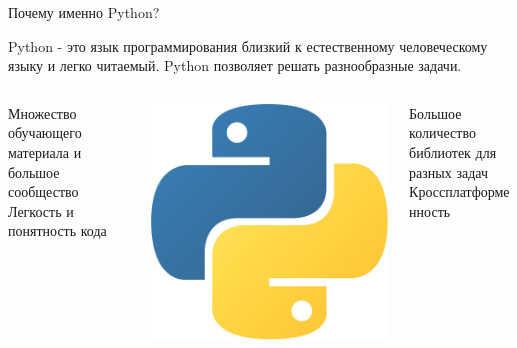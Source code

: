 \documentclass[handout]{beamer}
\begin{document}
    \begin{frame}{Почему именно Python?}
        \begin{tcolorbox}[colback=blue!5,colframe=blue!75!black]
           Python - это язык программирования близкий к естественному человеческому языку и легко читаемый. Python позволяет решать разнообразные задачи.
        \end{tcolorbox}
        \begin{columns}
            \begin{column}{0.37\textwidth}
                Множество обучающего материала и большое сообщество
                \newline \newline
                Легкость и понятность кода
            \end{column}
            \begin{column}{0.25\textwidth}
                \begin{center}
                    \includegraphics[width=\textwidth]{img/Python_logo_icon.png}
                \end{center}
            \end{column}
            \begin{column}{0.37\textwidth}
                Большое количество библиотек для разных задач
                \newline \newline
                Кроссплатформенность
            \end{column}
        \end{columns}
    \end{frame}
\end{document}
